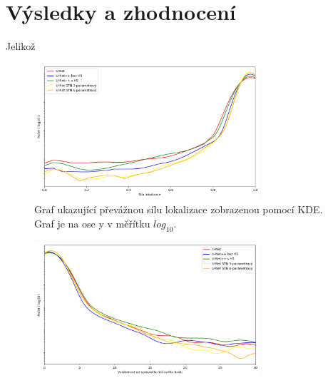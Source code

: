 \section{Výsledky a zhodnocení}
\label{sec:Chapter61}
Jelikož
\begin{figure}[H]
\centering
\includegraphics[width=0.75\textwidth,keepaspectratio]{Figures/plots/loc_strength.png}
\caption[Síla lokalizace modelů]{Graf ukazující převážnou sílu lokalizace zobrazenou pomocí KDE. Graf je na ose y v měřítku $log_{10}$. }
\label{fig:loc_strength}
\end{figure}

\begin{figure}[H]
\centering
\includegraphics[width=0.75\textwidth,keepaspectratio]{Figures/plots/loc_distance.png}
\caption[]{}
\label{fig:loc_distance}
\end{figure}
\endinput